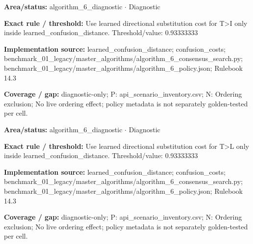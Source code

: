 \begin{tcolorbox}[enhanced,breakable,colback=white,colframe=Muted!45,boxrule=0.45pt,arc=1.5pt,left=6pt,right=6pt,top=5pt,bottom=5pt,title={\texttt{A6-LEARNED-SUBSTITUTION-T-I}},title after break={\texttt{A6-LEARNED-SUBSTITUTION-T-I}\ (continued)},fonttitle=\headingfont\bfseries\color{Navy},coltitle=Navy]
\textbf{Area/status:} algorithm\_\allowbreak{}6\_\allowbreak{}diagnostic $\boldsymbol{\cdot}$ Diagnostic\par
\smallskip
\textbf{Exact rule / threshold:} Use learned directional substitution cost for T>I only inside learned\_\allowbreak{}confusion\_\allowbreak{}distance. Threshold/\allowbreak{}value: 0.93333333\par
\smallskip
\textbf{Implementation source:} learned\_\allowbreak{}confusion\_\allowbreak{}distance; confusion\_\allowbreak{}costs; benchmark\_\allowbreak{}01\_\allowbreak{}legacy/\allowbreak{}master\_\allowbreak{}algorithms/\allowbreak{}algorithm\_\allowbreak{}6\_\allowbreak{}consensus\_\allowbreak{}search.py; benchmark\_\allowbreak{}01\_\allowbreak{}legacy/\allowbreak{}master\_\allowbreak{}algorithms/\allowbreak{}algorithm\_\allowbreak{}6\_\allowbreak{}policy.json; Rulebook 14.3\par
\smallskip
\textbf{Coverage / gap:} diagnostic-only; P: api\_\allowbreak{}scenario\_\allowbreak{}inventory.csv; N: Ordering exclusion; No live ordering effect; policy metadata is not separately golden-tested per cell.
\end{tcolorbox}
\begin{tcolorbox}[enhanced,breakable,colback=white,colframe=Muted!45,boxrule=0.45pt,arc=1.5pt,left=6pt,right=6pt,top=5pt,bottom=5pt,title={\texttt{A6-LEARNED-SUBSTITUTION-T-L}},title after break={\texttt{A6-LEARNED-SUBSTITUTION-T-L}\ (continued)},fonttitle=\headingfont\bfseries\color{Navy},coltitle=Navy]
\textbf{Area/status:} algorithm\_\allowbreak{}6\_\allowbreak{}diagnostic $\boldsymbol{\cdot}$ Diagnostic\par
\smallskip
\textbf{Exact rule / threshold:} Use learned directional substitution cost for T>L only inside learned\_\allowbreak{}confusion\_\allowbreak{}distance. Threshold/\allowbreak{}value: 0.93333333\par
\smallskip
\textbf{Implementation source:} learned\_\allowbreak{}confusion\_\allowbreak{}distance; confusion\_\allowbreak{}costs; benchmark\_\allowbreak{}01\_\allowbreak{}legacy/\allowbreak{}master\_\allowbreak{}algorithms/\allowbreak{}algorithm\_\allowbreak{}6\_\allowbreak{}consensus\_\allowbreak{}search.py; benchmark\_\allowbreak{}01\_\allowbreak{}legacy/\allowbreak{}master\_\allowbreak{}algorithms/\allowbreak{}algorithm\_\allowbreak{}6\_\allowbreak{}policy.json; Rulebook 14.3\par
\smallskip
\textbf{Coverage / gap:} diagnostic-only; P: api\_\allowbreak{}scenario\_\allowbreak{}inventory.csv; N: Ordering exclusion; No live ordering effect; policy metadata is not separately golden-tested per cell.
\end{tcolorbox}
